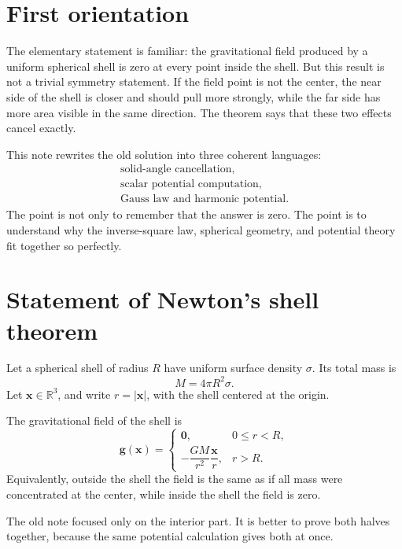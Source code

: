 
\section{First orientation}

The elementary statement is familiar: the gravitational field produced by a uniform spherical shell is zero at every point inside the shell.  But this result is not a trivial symmetry statement.  If the field point is not the center, the near side of the shell is closer and should pull more strongly, while the far side has more area visible in the same direction.  The theorem says that these two effects cancel exactly.

This note rewrites the old solution into three coherent languages:
\[
\begin{array}{c}
  \text{solid-angle cancellation,}\\
  \text{scalar potential computation,}\\
  \text{Gauss law and harmonic potential.}
\end{array}
\]
The point is not only to remember that the answer is zero.  The point is to understand why the inverse-square law, spherical geometry, and potential theory fit together so perfectly.

\section{Statement of Newton's shell theorem}

Let a spherical shell of radius \(R\) have uniform surface density \(\sigma\).  Its total mass is
\[
  M=4\pi R^2\sigma.
\]
Let \(\mathbf x\in\mathbb R^3\), and write \(r=|\mathbf x|\), with the shell centered at the origin.

\begin{theorem}
The gravitational field of the shell is
\[
\mathbf g(\mathbf x)=
\begin{cases}
\mathbf 0,&0\le r<R,\\[0.4em]
-\dfrac{GM}{r^2}\dfrac{\mathbf x}{r},&r>R.
\end{cases}
\]
Equivalently, outside the shell the field is the same as if all mass were concentrated at the center, while inside the shell the field is zero.
\end{theorem}

The old note focused only on the interior part.  It is better to prove both halves together, because the same potential calculation gives both at once.

